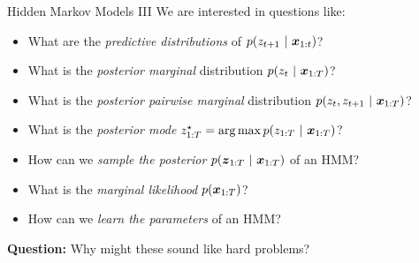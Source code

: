 \documentclass[aspectratio=169]{beamer}
\begin{document}
\begin{frame}{Hidden Markov Models III}
We are interested in questions like:
\begin{itemize}
    \item What are the \textit{predictive distributions} of $p(z_{t+1} ~\vert~ \boldsymbol{x}_{1:t})$?
    \item What is the \textit{posterior marginal} distribution $p(z_t ~\vert~ \boldsymbol{x}_{1:T})$?
    \item What is the \textit{posterior pairwise marginal} distribution $p(z_t, z_{t+1} ~\vert~ \boldsymbol{x}_{1:T})$?
    \item What is the \textit{posterior mode} $z_{1:T}^\star = \operatorname*{arg\,max} p(z_{1:T} ~\vert~ \boldsymbol{x}_{1:T})$?
    \item How can we \textit{sample the posterior} $p(\boldsymbol{z}_{1:T} ~\vert~ \boldsymbol{x}_{1:T})$ of an HMM?
    \item What is the \textit{marginal likelihood} $p(\boldsymbol{x}_{1:T})$?
    \item How can we \textit{learn the parameters} of an HMM?
\end{itemize}
\textbf{Question:} Why might these sound like hard problems?
\end{frame}

\end{document}
